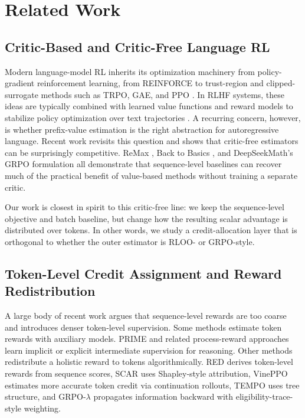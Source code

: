 \section{Related Work}\label{sec:related-work}

\subsection{Critic-Based and Critic-Free Language RL}

Modern language-model RL inherits its optimization machinery from policy-gradient reinforcement learning, from REINFORCE \citep{williams1992reinforce} to trust-region and clipped-surrogate methods such as TRPO, GAE, and PPO \citep{schulman2015trpo, schulman2016gae, schulman2017ppo}. In RLHF systems, these ideas are typically combined with learned value functions and reward models to stabilize policy optimization over text trajectories \citep{christiano2017preferences, ouyang2022instruct}. A recurring concern, however, is whether prefix-value estimation is the right abstraction for autoregressive language. Recent work revisits this question and shows that critic-free estimators can be surprisingly competitive. ReMax \citep{li2024remax}, Back to Basics \citep{ahmadian2024backtobasics}, and DeepSeekMath's GRPO formulation \citep{shao2024deepseekmath} all demonstrate that sequence-level baselines can recover much of the practical benefit of value-based methods without training a separate critic.

Our work is closest in spirit to this critic-free line: we keep the sequence-level objective and batch baseline, but change how the resulting scalar advantage is distributed over tokens. In other words, we study a credit-allocation layer that is orthogonal to whether the outer estimator is RLOO- or GRPO-style.

\subsection{Token-Level Credit Assignment and Reward Redistribution}

A large body of recent work argues that sequence-level rewards are too coarse and introduces denser token-level supervision. Some methods estimate token rewards with auxiliary models. PRIME \citep{cui2025prime} and related process-reward approaches learn implicit or explicit intermediate supervision for reasoning. Other methods redistribute a holistic reward to tokens algorithmically. RED \citep{huang2024red} derives token-level rewards from sequence scores, SCAR \citep{cao2025scar} uses Shapley-style attribution, VinePPO \citep{kazemnejad2024vineppo} estimates more accurate token credit via continuation rollouts, TEMPO \citep{tran2025tempo} uses tree structure, and GRPO-$\lambda$ \citep{parthasarathi2025grpolambda} propagates information backward with eligibility-trace-style weighting.

